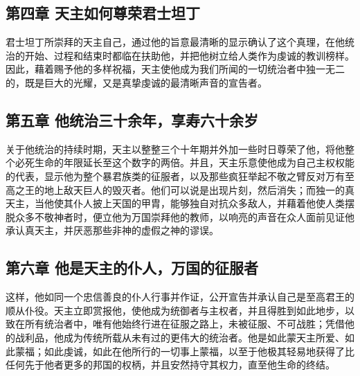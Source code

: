 
\subsection{第四章 天主如何尊荣君士坦丁}

君士坦丁所崇拜的天主自己，通过他的旨意最清晰的显示确认了这个真理，在他统治的开始、过程和结束时都临在扶助他，并把他树立给人类作为虔诚的教训榜样。因此，藉着赐予他的多样祝福，天主使他成为我们所闻的一切统治者中独一无二的，既是巨大的光耀，又是真挚虔诚的最清晰声音的宣告者。\par


\subsection{第五章 他统治三十余年，享寿六十余岁}

关于他统治的持续时期，天主以整整三个十年期并外加一些时日尊荣了他，将他整个必死生命的年限延长至这个数字的两倍。并且，天主乐意使他成为自己主权权能的代表，显示他为整个暴君族类的征服者，以及那些疯狂举起不敬之臂反对万有至高之王的地上敌天巨人的毁灭者。他们可以说是出现片刻，然后消失；而独一的真天主，当他使其仆人披上天国的甲胄，能够独自对抗众多敌人，并藉着他使人类摆脱众多不敬神者时，便立他为万国崇拜他的教师，以响亮的声音在众人面前见证他承认真天主，并厌恶那些非神的虚假之神的谬误。\par


\subsection{第六章 他是天主的仆人，万国的征服者}

这样，他如同一个忠信善良的仆人行事并作证，公开宣告并承认自己是至高君王的顺从仆役。天主立即赏报他，使他成为统御者与主权者，并且得胜到如此地步，以致在所有统治者中，唯有他始终行进在征服之路上，未被征服、不可战胜；凭借他的战利品，他成为传统所载从未有过的更伟大的统治者。他是如此蒙天主所爱、如此蒙福；如此虔诚，如此在他所行的一切事上蒙福，以至于他极其轻易地获得了比任何先于他者更多的邦国的权柄，并且安然持守其权力，直至他生命的终结。\par


